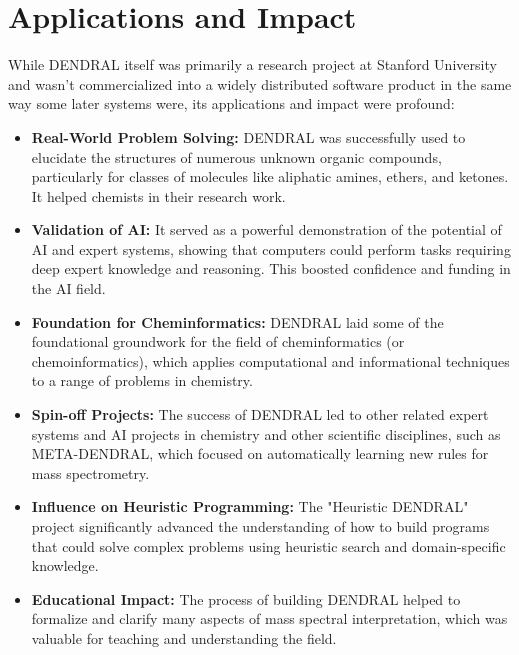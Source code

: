 \documentclass[12pt,a4paper]{article}
\begin{document}
\section{Applications and Impact}
While DENDRAL itself was primarily a research project at Stanford University and wasn't commercialized into a widely distributed software product in the same way some later systems were, its applications and impact were profound:
\begin{itemize}
    \item \textbf{Real-World Problem Solving:} DENDRAL was successfully used to elucidate the structures of numerous unknown organic compounds, particularly for classes of molecules like aliphatic amines, ethers, and ketones. It helped chemists in their research work.
    \item \textbf{Validation of AI:} It served as a powerful demonstration of the potential of AI and expert systems, showing that computers could perform tasks requiring deep expert knowledge and reasoning. This boosted confidence and funding in the AI field.
    \item \textbf{Foundation for Cheminformatics:} DENDRAL laid some of the foundational groundwork for the field of cheminformatics (or chemoinformatics), which applies computational and informational techniques to a range of problems in chemistry.
    \item \textbf{Spin-off Projects:} The success of DENDRAL led to other related expert systems and AI projects in chemistry and other scientific disciplines, such as META-DENDRAL, which focused on automatically learning new rules for mass spectrometry.
    \item \textbf{Influence on Heuristic Programming:} The "Heuristic DENDRAL" project significantly advanced the understanding of how to build programs that could solve complex problems using heuristic search and domain-specific knowledge.
    \item \textbf{Educational Impact:} The process of building DENDRAL helped to formalize and clarify many aspects of mass spectral interpretation, which was valuable for teaching and understanding the field.
\end{itemize}
\end{document}
